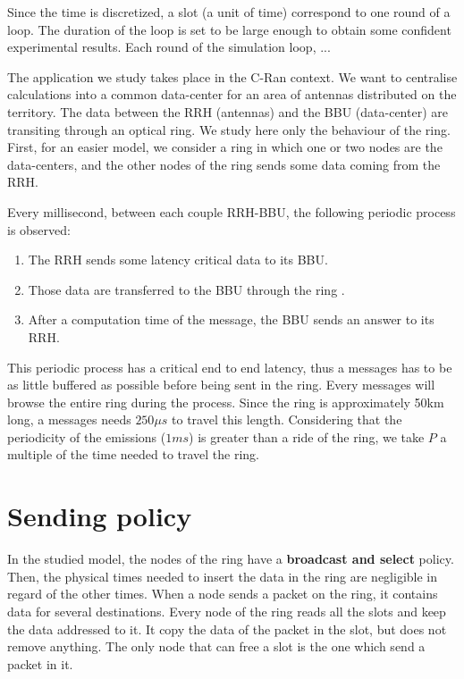 \documentclass[a4paper,10pt]{article}
\begin{document}
	Since the time is discretized, a slot (a unit of time) correspond to one round of a loop. The duration of the loop is set to be large enough to obtain some confident experimental results. Each round of the simulation loop, ...

The application we study takes place in the C-Ran context. We want to centralise calculations into a common data-center for an area of antennas distributed on the territory. The data between the RRH (antennas) and the BBU (data-center) are transiting through an optical ring. We study here only the behaviour of the ring. First, for an easier model, we consider a ring in which one or two nodes are the data-centers, and the other nodes of the ring sends some data coming from the RRH.

Every millisecond, between each couple RRH-BBU, the following periodic process is observed:
\begin{enumerate}
 \item The RRH sends some latency critical data to its BBU.
 \item Those data are transferred to the BBU through the ring .
 \item After a computation time of the message, the BBU sends an answer to its RRH.
\end{enumerate}
 This periodic process has a critical end to end latency, thus a messages has to be as little buffered as possible before being sent in the ring.
 Every messages will browse the entire ring during the process. Since the ring is approximately 50km long, a messages needs $250 \mu s$ to travel this length.
 Considering that the periodicity of the emissions ($1ms$) is greater than a ride of the ring, we take $P$ a multiple of the time needed to travel the ring.
 
 
 
\section*{Sending policy}
In the studied model, the nodes of the ring have a {\bf broadcast and select} policy. Then, the physical times needed to insert the data in the ring are negligible in regard of the other times.
When a node sends a packet on the ring, it contains data for several destinations. Every node of the ring reads all the slots and keep the data addressed to it. It copy the data of the packet in the slot, but does not remove anything. The only node that can free a slot is the one which send a packet in it.
\end{document}
